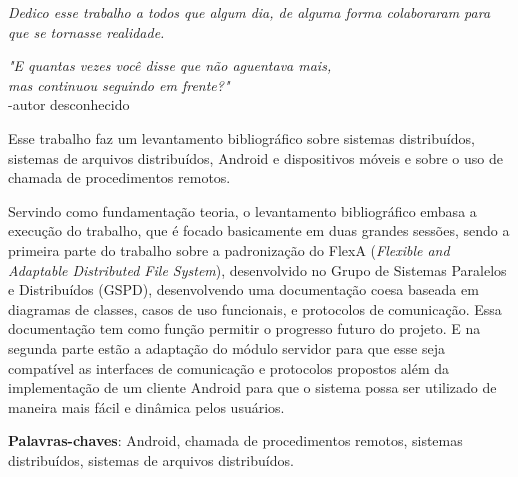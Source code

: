 \documentclass[
	12pt,				%
	openright,			%
	oneside,			%
	a4paper,			%
	english,			%
	brazil				%
	]{abntex2}
\begin{document}
\begin{dedicatoria}
   \vspace*{\fill}
   \centering
   \noindent
   \textit{ Dedico esse trabalho a todos que algum dia, de alguma forma colaboraram para que se tornasse realidade.} \vspace*{\fill}
\end{dedicatoria}

\begin{comment}

\begin{agradecimentos}

Agradeço a todos que algum dia, de alguma forma colaboraram para que se tornasse realidade.

\end{agradecimentos}

\end{comment}


\begin{epigrafe}
    \vspace*{\fill}
	\begin{flushright}
		\textit{"E quantas vezes você disse que não aguentava mais,\\ mas continuou seguindo em frente?"} \\
		-autor desconhecido
	\end{flushright}
\end{epigrafe}


\setlength{\absparsep}{18pt} %
\begin{resumo}
 
    Esse trabalho faz um levantamento bibliográfico sobre sistemas distribuídos, sistemas de arquivos distribuídos, Android e dispositivos móveis e sobre o uso de chamada de procedimentos remotos. 
 
    Servindo como fundamentação teoria, o levantamento bibliográfico embasa a execução do trabalho, que é focado basicamente em duas grandes sessões, sendo a primeira parte do trabalho sobre a padronização do FlexA (\textit{Flexible and Adaptable Distributed File System}), desenvolvido no Grupo de Sistemas Paralelos e Distribuídos (GSPD), desenvolvendo uma documentação coesa baseada em diagramas de classes, casos de uso funcionais, e protocolos de comunicação. Essa documentação tem como função permitir o progresso futuro do projeto. E na segunda parte estão a adaptação do módulo servidor para que esse seja compatível as interfaces de comunicação e protocolos propostos além da implementação de um cliente Android para que o sistema possa ser utilizado de maneira mais fácil e dinâmica pelos usuários.

 \textbf{Palavras-chaves}: Android, chamada de procedimentos remotos, sistemas distribuídos, sistemas de arquivos distribuídos.
\end{resumo}
\end{document}
